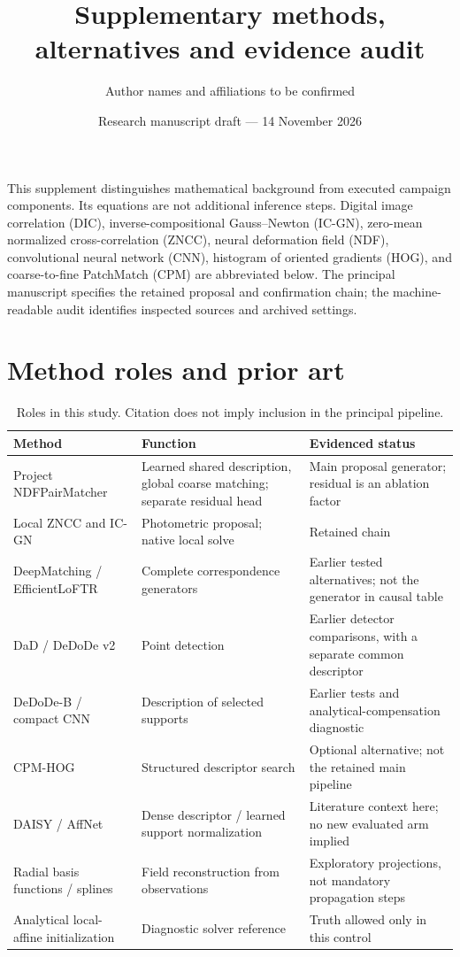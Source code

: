 \documentclass[11pt,a4paper]{article}
\title{Supplementary methods, alternatives and evidence audit}
\author{Author names and affiliations to be confirmed}
\date{Research manuscript draft --- 14 November 2026}
\begin{document}
\maketitle
This supplement distinguishes mathematical background from executed campaign components. Its equations are not additional inference steps. Digital image correlation (DIC), inverse-compositional Gauss--Newton (IC-GN), zero-mean normalized cross-correlation (ZNCC), neural deformation field (NDF), convolutional neural network (CNN), histogram of oriented gradients (HOG), and coarse-to-fine PatchMatch (CPM) are abbreviated below. The principal manuscript specifies the retained proposal and confirmation chain; the machine-readable audit identifies inspected sources and archived settings.
\section{Method roles and prior art}
\begin{table}[ht]\small\centering
\caption{Roles in this study. Citation does not imply inclusion in the principal pipeline.}
\begin{tabular}{p{.25\linewidth}p{.28\linewidth}p{.35\linewidth}}\toprule
Method & Function & Evidenced status\\\midrule
Project NDFPairMatcher & Learned shared description, global coarse matching; separate residual head & Main proposal generator; residual is an ablation factor\\
Local ZNCC and IC-GN & Photometric proposal; native local solve & Retained chain\\
DeepMatching / EfficientLoFTR & Complete correspondence generators & Earlier tested alternatives; not the generator in causal table\\
DaD / DeDoDe v2 & Point detection & Earlier detector comparisons, with a separate common descriptor\\
DeDoDe-B / compact CNN & Description of selected supports & Earlier tests and analytical-compensation diagnostic\\
CPM-HOG & Structured descriptor search & Optional alternative; not the retained main pipeline\\
DAISY / AffNet & Dense descriptor / learned support normalization & Literature context here; no new evaluated arm implied\\
Radial basis functions / splines & Field reconstruction from observations & Exploratory projections, not mandatory propagation steps\\
Analytical local-affine initialization & Diagnostic solver reference & Truth allowed only in this control\\\bottomrule
\end{tabular}\end{table}
\end{document}
